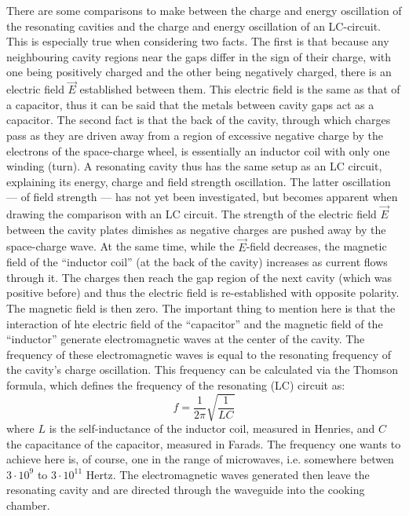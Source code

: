 There are some comparisons to make between the charge and energy oscillation of the resonating cavities and the charge and energy oscillation of an LC-circuit. This is especially true when considering two facts. The first is that because any neighbouring cavity regions near the gaps differ in the sign of their charge, with one being positively charged and the other being negatively charged, there is an electric field $\vec{E}$ established between them. This electric field is the same as that of a capacitor, thus it can be said that the metals between cavity gaps act as a capacitor. The second fact is that the back of the cavity, through which charges pass as they are driven away from a region of excessive negative charge by the electrons of the space-charge wheel, is essentially an inductor coil with only one winding (turn). A resonating cavity thus has the same setup as an LC circuit, explaining its energy, charge and field strength oscillation. The latter oscillation --- of field strength --- has not yet been investigated, but becomes apparent when drawing the comparison with an LC circuit. The strength of the electric field $\vec{E}$ between the cavity plates dimishes as negative charges are pushed away by the space-charge wave. At the same time, while the $\vec{E}$-field decreases, the magnetic field of the ``inductor coil'' (at the back of the cavity) increases as current flows through it. The charges then reach the gap region of the next cavity (which was positive before) and thus the electric field is re-established with opposite polarity. The magnetic field is then zero. The important thing to mention here is that the interaction of hte electric field of the ``capacitor'' and the magnetic field of the ``inductor'' generate electromagnetic waves at the center of the cavity. The frequency of these electromagnetic waves is equal to the resonating frequency of the cavity's charge oscillation. This frequency can be calculated via the Thomson formula, which defines the frequency of the resonating (LC) circuit as: $$f = \frac{1}{2 \pi} \sqrt{\frac{1}{LC}}$$ where $L$ is the self-inductance of the inductor coil, measured in Henries, and $C$ the capacitance of the capacitor, measured in Farads. The frequency one wants to achieve here is, of course, one in the range of microwaves, i.e. somewhere betwen $3 \cdot 10^9$ to $3 \cdot 10^11$ Hertz. The electromagnetic waves generated then leave the resonating cavity and are directed through the waveguide into the cooking chamber.

\pagebreak

